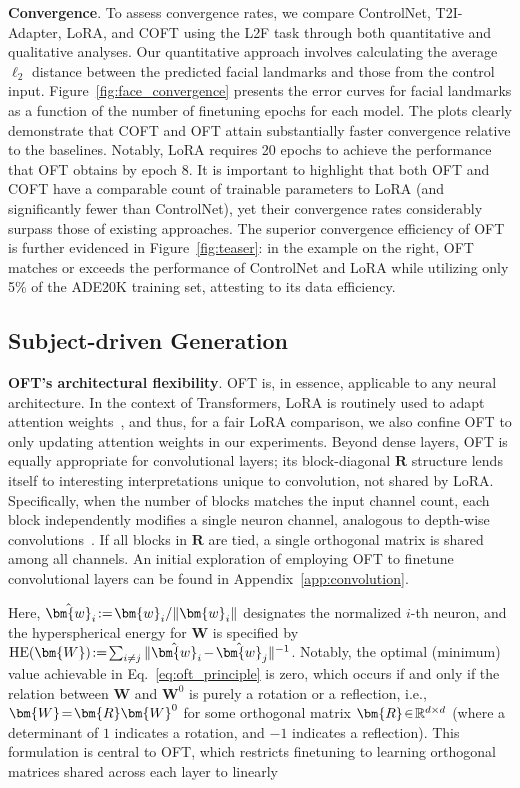 \begin{itemize}[leftmargin=*,nosep]
\textbf{Convergence}. To assess convergence rates, we compare ControlNet, T2I-Adapter, LoRA, and COFT using the L2F task through both quantitative and qualitative analyses. Our quantitative approach involves calculating the average $\ell_2$ distance between the predicted facial landmarks and those from the control input. Figure~\ref{fig:face_convergence} presents the error curves for facial landmarks as a function of the number of finetuning epochs for each model. The plots clearly demonstrate that COFT and OFT attain substantially faster convergence relative to the baselines. Notably, LoRA requires 20 epochs to achieve the performance that OFT obtains by epoch 8. It is important to highlight that both OFT and COFT have a comparable count of trainable parameters to LoRA (and significantly fewer than ControlNet), yet their convergence rates considerably surpass those of existing approaches. The superior convergence efficiency of OFT is further evidenced in Figure~\ref{fig:teaser}: in the example on the right, OFT matches or exceeds the performance of ControlNet and LoRA while utilizing only 5\% of the ADE20K training set, attesting to its data efficiency. 

\subsection{Subject-driven Generation}

\textbf{OFT's architectural flexibility}. OFT is, in essence, applicable to any neural architecture. In the context of Transformers, LoRA is routinely used to adapt attention weights~\cite{hulora2022}, and thus, for a fair LoRA comparison, we also confine OFT to only updating attention weights in our experiments. Beyond dense layers, OFT is equally appropriate for convolutional layers; its block-diagonal $\bm{R}$ structure lends itself to interesting interpretations unique to convolution, not shared by LoRA. Specifically, when the number of blocks matches the input channel count, each block independently modifies a single neuron channel, analogous to depth-wise convolutions~\cite{chollet2017xception}. If all blocks in $\bm{R}$ are tied, a single orthogonal matrix is shared among all channels. An initial exploration of employing OFT to finetune convolutional layers can be found in Appendix~\ref{app:convolution}.

Here, $\thickmuskip=2mu \medmuskip=2mu \hat{\bm{w}}_i:=\bm{w}_i/\|\bm{w}_i\|$ designates the normalized $i$-th neuron, and the hyperspherical energy for $\bm{W}$ is specified by $\thickmuskip=2mu \medmuskip=2mu \text{HE}(\bm{W}):= \sum_{i\neq j} \|\hat{\bm{w}}_i-\hat{\bm{w}}_j\|^{-1}$. Notably, the optimal (minimum) value achievable in Eq.~\eqref{eq:oft_principle} is zero, which occurs if and only if the relation between $\bm{W}$ and $\bm{W}^0$ is purely a rotation or a reflection, i.e., $\thickmuskip=2mu \medmuskip=2mu \bm{W}=\bm{R}\bm{W}^0$ for some orthogonal matrix $\thickmuskip=2mu \medmuskip=2mu \bm{R}\in\mathbb{R}^{d\times d}$ (where a determinant of $1$ indicates a rotation, and $-1$ indicates a reflection). This formulation is central to OFT, which restricts finetuning to learning orthogonal matrices shared across each layer to linearly


\end{itemize}
